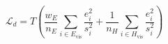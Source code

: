 \documentclass{article}
\begin{document}
\fontsize{22}{29}\selectfont
\[
\mathcal L_d=T\left(\frac{w_E}{n_E}\sum_{i\in E_{\mathrm{vis}}}\frac{e_i^2}{s_i^2}+\frac{1}{n_H}\sum_{i\in H_{\mathrm{vis}}}\frac{e_i^2}{s_i^2}\right)
\]
\end{document}
